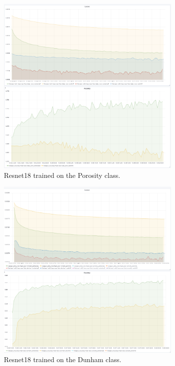 \begin{figure}
\begin{subfigure}{.5\textwidth}
  \centering
  \includegraphics[width=.8\linewidth]{figures/04-Init_poro_acc.PNG}
  \caption{Resnet18 trained on the Porosity class.}
  \label{fig:resinit_poro}
\end{subfigure}%
\begin{subfigure}{.5\textwidth}
  \centering
  \includegraphics[width=.8\linewidth]{figures/04-Init_dunham_acc.PNG}
  \caption{Resnet18 trained on the Dunham class.}
  \label{fig:resinit_dunham}
\end{subfigure}
\begin{subfigure}{.5\textwidth}

\end{subfigure}
\end{figure}
